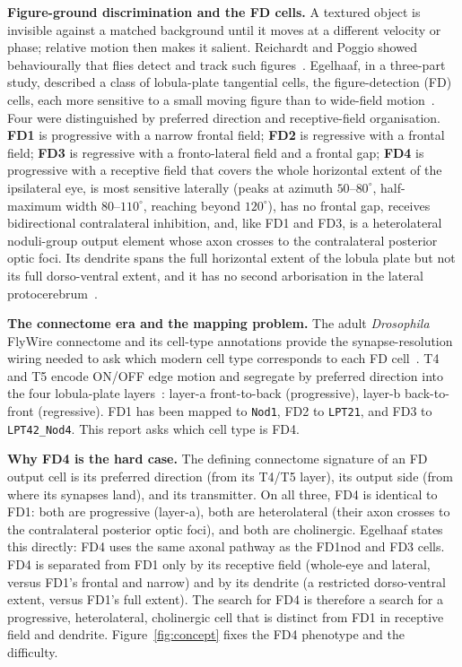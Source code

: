 \documentclass[11pt]{article}
\newcommand{\ttt}[1]{\texttt{#1}}
\begin{document}
\textbf{Figure-ground discrimination and the FD cells.}\quad
A textured object is invisible against a matched background until it moves at a different velocity or
phase; relative motion then makes it salient. Reichardt and Poggio showed behaviourally that flies
detect and track such figures~\cite{rp1979}. Egelhaaf, in a three-part study, described a class of
lobula-plate tangential cells, the figure-detection (FD) cells, each more sensitive to a small moving
figure than to wide-field motion~\cite{egelhaaf1985b}. Four were distinguished by preferred direction
and receptive-field organisation. \textbf{FD1} is progressive with a narrow frontal field; \textbf{FD2}
is regressive with a frontal field; \textbf{FD3} is regressive with a fronto-lateral field and a
frontal gap; \textbf{FD4} is progressive with a receptive field that covers the whole horizontal
extent of the ipsilateral eye, is most sensitive laterally (peaks at azimuth $50$--$80^\circ$,
half-maximum width $80$--$110^\circ$, reaching beyond $120^\circ$), has no frontal gap, receives
bidirectional contralateral inhibition, and, like FD1 and FD3, is a heterolateral noduli-group output
element whose axon crosses to the contralateral posterior optic foci. Its dendrite spans the full
horizontal extent of the lobula plate but not its full dorso-ventral extent, and it has no second
arborisation in the lateral protocerebrum~\cite[p.~204--206]{egelhaaf1985b}.

\textbf{The connectome era and the mapping problem.}\quad
The adult \emph{Drosophila} FlyWire connectome and its cell-type annotations provide the
synapse-resolution wiring needed to ask which modern cell type corresponds to each FD
cell~\cite{dorkenwald2024,schlegel2024,codex}. T4 and T5 encode ON/OFF edge motion and segregate by
preferred direction into the four lobula-plate layers~\cite{maisak2013,fd1989}: layer-a front-to-back
(progressive), layer-b back-to-front (regressive). FD1 has been mapped to \ttt{Nod1}, FD2 to
\ttt{LPT21}, and FD3 to \ttt{LPT42\_Nod4}. This report asks which cell type is FD4.

\textbf{Why FD4 is the hard case.}\quad
The defining connectome signature of an FD output cell is its preferred direction (from its T4/T5
layer), its output side (from where its synapses land), and its transmitter. On all three, FD4 is
identical to FD1: both are progressive (layer-a), both are heterolateral (their axon crosses to the
contralateral posterior optic foci), and both are cholinergic. Egelhaaf states this directly: FD4
uses the same axonal pathway as the FD1nod and FD3 cells. FD4 is separated from FD1 only by its
receptive field (whole-eye and lateral, versus FD1's frontal and narrow) and by its dendrite (a
restricted dorso-ventral extent, versus FD1's full extent). The search for FD4 is therefore a search
for a progressive, heterolateral, cholinergic cell that is distinct from FD1 in receptive field and
dendrite. Figure~\ref{fig:concept} fixes the FD4 phenotype and the difficulty.
\end{document}
